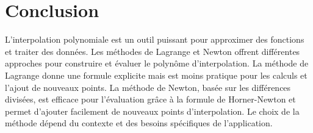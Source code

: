 \documentclass{article}
\begin{document}
\section{Conclusion}

L'interpolation polynomiale est un outil puissant pour approximer des fonctions et traiter des données. Les méthodes de Lagrange et Newton offrent différentes approches pour construire et évaluer le polynôme d'interpolation. La méthode de Lagrange donne une formule explicite mais est moins pratique pour les calculs et l'ajout de nouveaux points. La méthode de Newton, basée sur les différences divisées, est efficace pour l'évaluation grâce à la formule de Horner-Newton et permet d'ajouter facilement de nouveaux points d'interpolation. Le choix de la méthode dépend du contexte et des besoins spécifiques de l'application.
\end{document}
